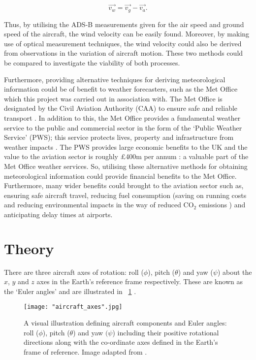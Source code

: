 \documentclass[11pt]{article}
\newcommand{\figref}[2][\figurename~]{#1\ref{#2}}
\begin{document}
\begin{equation}
\label{eq:wind_vel}
\Vec{v_w} = \Vec{v_g} - \Vec{v_a}.
\end{equation}

Thus, by utilising the ADS-B measurements given for the air speed and ground speed of the aircraft, the wind velocity can be easily found. Moreover, by making use of optical measurement techniques, the wind velocity could also be derived from observations in the variation of aircraft motion. These two methods could be compared to investigate the viability of both processes.

Furthermore, providing alternative techniques for deriving meteorological information could be of benefit to weather forecasters, such as the Met Office which this project was carried out in association with. The Met Office is designated by the Civil Aviation Authority (CAA) to ensure safe and reliable transport \cite{Web01}. In addition to this, the Met Office provides a fundamental weather service to the public and commercial sector in the form of the `Public Weather Service' (PWS); this service protects lives, property and infrastructure from weather impacts \cite{Web02}. The PWS provides large economic benefits to the UK and the value to the aviation sector is roughly £400m per annum \cite{Web02}: a valuable part of the Met Office weather services. So, utilising these alternative methods for obtaining meteorological information could provide financial benefits to the Met Office. Furthermore, many wider benefits could brought to the aviation sector such as, ensuring safe aircraft travel, reducing fuel consumption (saving on running costs and reducing environmental impacts in the way of reduced CO$_2$ emissions \cite{Paper01}) and anticipating delay times at airports.



\section{Theory}
\label{sec:theory}

There are three aircraft axes of rotation: roll ($\phi$), pitch ($\theta$) and yaw ($\psi$) about the $x$,  $y$ and $z$ axes in the Earth's reference frame respectively. These are known as the `Euler angles' and are illustrated in \figref{fig:aircraft_angles} \cite{Web01}.

\begin{figure}[h]
\centering
\texttt{[image: "aircraft\_axes".jpg]}
\caption{A visual illustration defining aircraft components and Euler angles: roll ($\phi$), pitch ($\theta$) and yaw $(\psi$) {\textendash} including their positive rotational directions along with the co-ordinate axes defined in the Earth's frame of reference. Image adapted from \cite{Web04}.}
\label{fig:aircraft_angles}
\end{figure}
\end{document}
